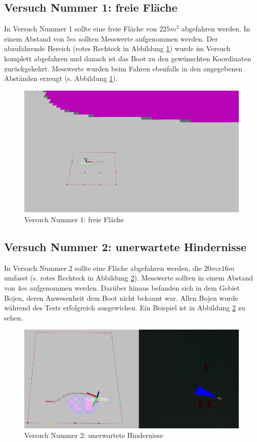 \documentclass[11pt]{article}
\begin{document}
\subsection{Versuch Nummer 1: freie Fläche}
In Versuch Nummer 1 sollte eine freie Fläche von $225m^2$ abgefahren werden. In einem Abstand von $5m$ sollten Messwerte aufgenommen werden. Der abzufahrende Bereich (rotes Rechteck in Abbildung \ref{Versuch1}) wurde im Versuch komplett abgefahren und danach ist das Boot zu den gewünschten Koordinaten zurückgekehrt. Messwerte wurden beim Fahren ebenfalls in den angegebenen Abständen erzeugt (s. Abbildung \ref{Versuch1}).

\begin{figure}[H]
	\centering
	\includegraphics[width=0.8\linewidth]{versuch1.png}
	\caption{Versuch Nummer 1: freie Fläche}
	\label{Versuch1}
\end{figure}

\subsection{Versuch Nummer 2: unerwartete Hindernisse}
In Versuch Nummer 2 sollte eine Fläche abgefahren werden, die $20mx16m$ umfasst (s. rotes Rechteck in Abbildung \ref{Versuch2}). Messwerte sollten in einem Abstand von $4m$ aufgenommen werden. Darüber hinaus befanden sich in dem Gebiet Bojen, deren Anwesenheit dem Boot nicht bekannt war. Allen Bojen wurde während des Tests erfolgreich ausgewichen. Ein Beispiel ist in Abbildung \ref{Versuch2} zu sehen.

\begin{figure}[H]
	\centering
	\includegraphics[width=0.8\linewidth]{versuch2.png}
	\caption{Versuch Nummer 2: unerwartete Hindernisse}
	\label{Versuch2}
\end{figure}
\end{document}
